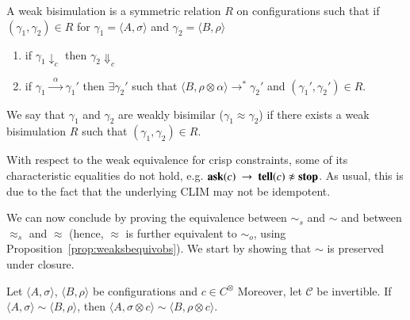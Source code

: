 \documentclass[main.tex]{subfiles}
\begin{document}
\begin{definition}\label{def:weak} A weak bisimulation is a symmetric
relation $R$ on configurations such that if $(\gamma_1, \gamma_2) \in R$ for $\gamma_1 = \langle A, \sigma \rangle$ and $\gamma_2 = \langle B, \rho\rangle$
\begin{enumerate}
\item if $\gamma_1 \downarrow_c$ then $\gamma_2 \Downarrow_c$
\item if $\gamma_1 \xrightarrow{\; \; \alpha\;  \;} \gamma_1'$ then $\exists \gamma_2'$ such that $\langle B, \rho \otimes \alpha \rangle \longrightarrow^* \gamma_2'$ and $(\gamma_1', \gamma_2') \in R$.
\end{enumerate}
We say that $\gamma_1$ and $\gamma_2$ are weakly bisimilar ($\gamma_1 \approx \gamma_2$) if there exists a weak bisimulation $R$ such that $(\gamma_1, \gamma_2) \in R$.
\end{definition}

With respect to the weak equivalence for crisp constraints, some of its characteristic equalities do not hold, e.g.
${\bf ask}(c) \ \rightarrow \ {\bf tell}({c}) \not  \approx {\bf stop}$. As usual, this is due to the fact that the underlying CLIM may not be idempotent.

We can now conclude by proving the equivalence between $\sim_{\mathit{s}}$ and $\sim$ and between $\approx_{\mathit{s}}$ and $\approx$ (hence, $\approx$ is further equivalent to $\sim_o$, using Proposition~\ref{prop:weaksbequivobs}). We start by showing that $\sim$ is preserved under closure.

\begin{lemma}\label{lemma:equality}
Let $\langle A, \sigma\rangle$, $\langle B, \rho\rangle$ be configurations and $c \in C^\otimes$
 Moreover, let $\mathcal{C}$ be invertible. 
If $\langle A, \sigma\rangle \sim \langle B, \rho\rangle$, then $\langle A, \sigma \otimes c \rangle \sim \langle B, \rho \otimes c\rangle$.
\end{lemma}
\end{document}
